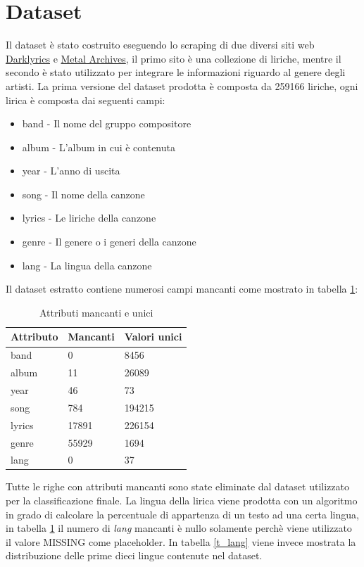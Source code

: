 \documentclass[technote]{IEEEtran}
\begin{document}
\section{Dataset}
Il dataset è stato costruito eseguendo lo scraping di due diversi siti web \href{http://www.darklyrics.com}{Darklyrics} e \href{https://www.metal-archives.com/}{Metal Archives}, il primo sito è una collezione di liriche, mentre il secondo è stato utilizzato per integrare le informazioni riguardo al genere degli artisti. 
La prima versione del dataset prodotta è composta da 259166 liriche, ogni lirica è composta dai seguenti campi:
\begin{itemize}
\item band - Il nome del gruppo compositore
\item album - L'album in cui è contenuta
\item year - L'anno di uscita
\item song - Il nome della canzone
\item lyrics - Le liriche della canzone
\item genre - Il genere o i generi della canzone
\item lang - La lingua della canzone
\end{itemize}
Il dataset estratto contiene numerosi campi mancanti come mostrato in tabella \ref{t_missing}:
\begin{table}[H]
\centering
\caption{Attributi mancanti e unici}
\begin{tabular}{|l|l|l|}
\hline
\textbf{Attributo} & \textbf{Mancanti} & \textbf{Valori unici} \\ \hline
band               & 0                 & 8456                  \\ \hline
album              & 11                & 26089                 \\ \hline
year               & 46                & 73                    \\ \hline
song               & 784               & 194215                \\ \hline
lyrics             & 17891             & 226154                \\ \hline
genre              & 55929             & 1694                  \\ \hline
lang               & 0             	   & 37                    \\ \hline
\end{tabular}
\label{t_missing}
\end{table}
Tutte le righe con attributi mancanti sono state eliminate dal dataset utilizzato per la classificazione finale. La lingua della lirica viene prodotta con un algoritmo in grado di calcolare la percentuale di appartenza di un testo ad una certa lingua, in tabella \ref{t_missing} il numero di \textit{lang} mancanti è nullo solamente perchè viene utilizzato il valore MISSING come placeholder. In tabella \ref{t_lang} viene invece mostrata la distribuzione delle prime dieci lingue contenute nel dataset.
\end{document}
